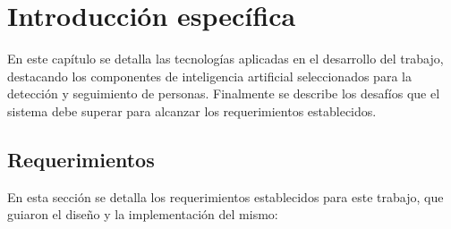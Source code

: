 \chapter{Introducción específica} %

\label{Chapter2}

En este capítulo se detalla las tecnologías aplicadas en el desarrollo del trabajo, destacando los componentes de inteligencia artificial seleccionados para la detección y seguimiento de personas. Finalmente se describe los desafíos que el sistema debe superar para alcanzar los requerimientos establecidos.


\section{Requerimientos}
\label{sec:requerimientos}

En esta sección se detalla los requerimientos establecidos para este trabajo, que guiaron el diseño y la implementación del mismo:

